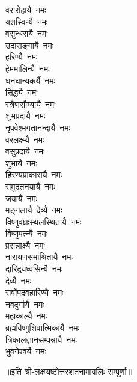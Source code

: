 \begin{multicols}{2}
\begin{flushleft}
वरारोहायै~नमः\\
यशस्विन्यै~नमः\hfill{}\\
वसुन्धरायै~नमः\\
उदाराङ्गायै~नमः\\
हरिण्यै~नमः\\
हेममालिन्यै~नमः\\
धनधान्यकर्यै~नमः\\
सिद्ध्यै~नमः\\
स्त्रैणसौम्यायै~नमः\\
शुभप्रदायै~नमः\\
नृपवेश्मगतानन्दायै~नमः\\
वरलक्ष्म्यै~नमः\hfill{}\\
वसुप्रदायै~नमः\\
शुभायै~नमः\\
हिरण्यप्राकारायै~नमः\\
समुद्रतनयायै~नमः\\
जयायै~नमः\\
मङ्गलायै~देव्यै~नमः\\
विष्णुवक्षःस्थलस्थितायै~नमः\\
विष्णुपत्न्यै~नमः\\
प्रसन्नाक्ष्यै~नमः\\
नारायणसमाश्रितायै~नमः\hfill{}\\
दारिद्र्यध्वंसिन्यै~नमः\\
देव्यै~नमः\\
सर्वोपद्रवहारिण्यै~नमः\\
नवदुर्गायै~नमः\\
महाकाल्यै~नमः\\
ब्रह्मविष्णुशिवात्मिकायै~नमः\\
त्रिकालज्ञानसम्पन्नायै~नमः\\
भुवनेश्वर्यै~नमः\hfill{}\\
\end{flushleft}
\end{multicols}
॥इति श्री-लक्ष्म्यष्टोत्तरशतनामावलिः सम्पूर्णा॥